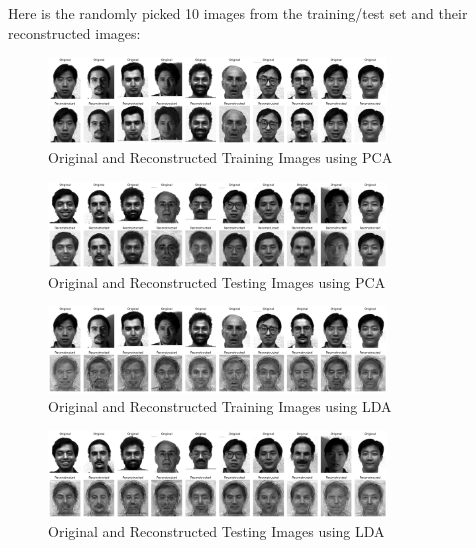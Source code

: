 \documentclass{homework}
\begin{document}
Here is the randomly picked 10 images from the training/test set and their reconstructed images:

\begin{figure}[H]
    \centering
    \includegraphics[width=0.8\textwidth]{figures/reconstructed_images_pca_training.png}
    \caption{Original and Reconstructed Training Images using PCA}
\end{figure}

\begin{figure}[H]
    \centering
    \includegraphics[width=0.8\textwidth]{figures/reconstructed_images_pca_testing.png}
    \caption{Original and Reconstructed Testing Images using PCA}
\end{figure}

\begin{figure}[H]
    \centering
    \includegraphics[width=0.8\textwidth]{figures/reconstructed_images_lda_training.png}
    \caption{Original and Reconstructed Training Images using LDA}
\end{figure}

\begin{figure}[H]
    \centering
    \includegraphics[width=0.8\textwidth]{figures/reconstructed_images_lda_testing.png}
    \caption{Original and Reconstructed Testing Images using LDA}
\end{figure}
\end{document}
